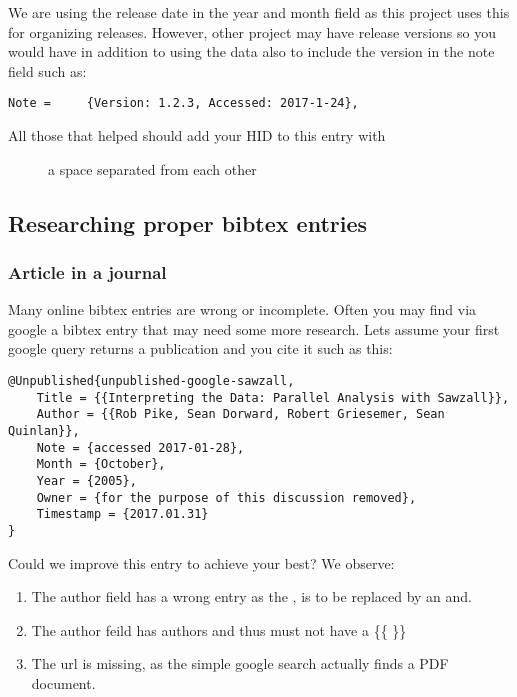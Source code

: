We are using the release date in the year and month field as this
project uses this for organizing releases. However, other project may
have release versions so you would have in addition to using the data
also to include the version in the note field such as:

\begin{verbatim}
Note =     {Version: 1.2.3, Accessed: 2017-1-24},
\end{verbatim}

\begin{description}
\item[All those that helped should add your HID to this entry with]
a space separated from each other
\end{description}

\subsection{Researching proper bibtex
entries}\label{researching-proper-bibtex-entries}

\subsubsection{Article in a journal}\label{article-in-a-journal}

Many online bibtex entries are wrong or incomplete. Often you may find
via google a bibtex entry that may need some more research. Lets assume
your first google query returns a publication and you cite it such as
this:

\begin{verbatim}
@Unpublished{unpublished-google-sawzall,
    Title = {{Interpreting the Data: Parallel Analysis with Sawzall}},
    Author = {{Rob Pike, Sean Dorward, Robert Griesemer, Sean Quinlan}},
    Note = {accessed 2017-01-28},
    Month = {October},
    Year = {2005},
    Owner = {for the purpose of this discussion removed},
    Timestamp = {2017.01.31}
}
\end{verbatim}

Could we improve this entry to achieve your best? We observe:

\begin{enumerate}
\def\labelenumi{\arabic{enumi}.}
\tightlist
\item
  The author field has a wrong entry as the , is to be replaced by an
  and.
\item
  The author feild has authors and thus must not have a \{\{ \}\}
\item
  The url is missing, as the simple google search actually finds a PDF
  document.
\end{enumerate}

